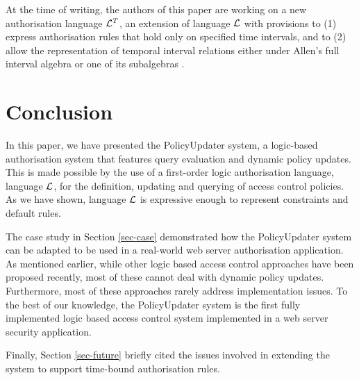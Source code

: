 \documentclass[global,twocolumn,final]{svjour}
\begin{document}
    At the time of writing, the authors of this paper are working on a new
    authorisation language ${\cal L}^{T}$, an extension of language ${\cal L}$
    with provisions to (1) express authorisation rules that hold only on
    specified time intervals, and to (2) allow the representation of temporal
    interval relations either under Allen's full interval algebra or one of its
    subalgebras \cite{KRO}.

  \section{Conclusion}
    \label{sec-conclusion}

    In this paper, we have presented the PolicyUpdater system, a logic-based
    authorisation system that features query evaluation and dynamic policy
    updates. This is made possible by the use of a first-order logic
    authorisation language, language ${\cal L}$, for the definition, updating
    and querying of access control policies. As we have shown, language
    ${\cal L}$ is expressive enough to represent constraints and default rules.

    The case study in Section \ref{sec-case} demonstrated how the PolicyUpdater
    system can be adapted to be used in a real-world web server authorisation
    application. As mentioned earlier, while other logic based access control
    approaches have been proposed recently, most of these cannot deal with
    dynamic policy updates. Furthermore, most of these approaches rarely
    address implementation issues. To the best of our knowledge, the
    PolicyUpdater system is the first fully implemented logic based access
    control system implemented in a web server security application.

    Finally, Section \ref{sec-future} briefly cited the issues involved in
    extending the system to support time-bound authorisation rules.
\end{document}
